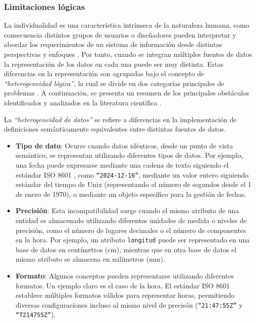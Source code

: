     \subsubsection{Limitaciones l\'ogicas}

    La individualidad es una característica intrínseca de la naturaleza humana,
    como consecuencia distintos grupos de usuarios o diseñadores pueden interpretar y
    abordar los requerimientos de un sistema de información desde distintas perspectivas y enfoques \cite{doan2012principles, halevy2006data}. Por tanto, cuando se integran
    múltiples fuentes de datos la representación de los datos en cada una puede ser muy distinta.
    Estas diferencias en la representación son agrupadas bajo el concepto de \textit{``heterogeneidad lógica''}, la cual se divide en dos categorías principales
    de problemas \cite{hakimpour2001resolving}. A continuación, se presenta un resumen de los principales obstáculos identificados y analizados en la literatura científica \cite{Batini1986, breitbart1986database, breitbart1990multidatabase, reddy1994methodology, halevy2006data, hakimpour2001resolving}.

    La \textit{``heterogeneidad de datos''} se refiere a diferencias en la implementación de definiciones semánticamente equivalentes entre distintas fuentes de datos. 

    \begin{itemize}
        \item \textbf{Tipo de dato}: Ocurre cuando datos idénticos, desde un punto de vista semántico, se representan
        utilizando diferentes tipos de datos. Por ejemplo, una fecha puede expresarse mediante una cadena de texto siguiendo
        el estándar ISO 8601 \cite{iso8601}, como \texttt{``2024-12-16''}, 
        mediante un valor entero siguiendo estándar del tiempo de Unix \cite{unix_time_wiki} (representando el número de segundos desde el 1 de enero de 1970), o mediante un objeto específico para la gestión de fechas.
        \item \textbf{Precisión}: Esta incompatibilidad surge cuando el mismo atributo de una entidad es almacenado utilizando 
        diferentes unidades de medida o niveles de precisión, como el número de lugares decimales o el número de componentes en la hora. Por ejemplo, un atributo \texttt{longitud}
        puede ser representado en una base de datos en centímetros (cm), mientras que en otra base de datos el mismo atributo se almacena en milímetros (mm).
        \item \textbf{Formato}: Algunos conceptos pueden representarse utilizando diferentes formatos. Un ejemplo claro es el caso de la hora. 
        El estándar ISO 8601 establece múltiples formatos válidos para representar horas, permitiendo diversas configuraciones incluso al mismo nivel
        de precisón (\texttt{``21:47:55Z''} y \texttt{``T214755Z''}).
    \end{itemize}

